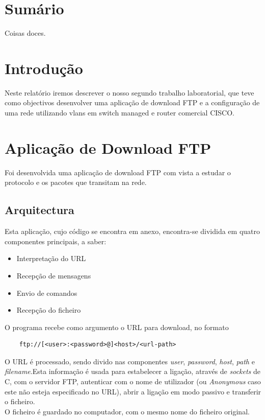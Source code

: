 \documentclass[a4paper,11pt]{article}
\begin{document}
\newpage
\section{Sumário}
Coisas doces.

\section{Introdução}
Neste relatório iremos descrever o nosso segundo trabalho laboratorial, que teve como objectivos desenvolver uma aplicação de download FTP e a configuração de uma rede utilizando vlans em switch managed e router comercial CISCO.

\section{Aplicação de Download FTP}
Foi desenvolvida uma aplicação de download FTP com vista a estudar o protocolo e os pacotes que transitam na rede.
\subsection{Arquitectura}
Esta aplicação, cujo código se encontra em anexo, encontra-se dividida em quatro componentes principais, a saber:
\begin{itemize}
\item Interpretação do URL
\item Recepção de mensagens
\item Envio de comandos
\item Recepção do ficheiro
\end{itemize}
\vspace{5pt}

O programa recebe como argumento o URL para download, no formato
\begin{lstlisting}
	ftp://[<user>:<password>@]<host>/<url-path>
\end{lstlisting}

O URL é processado, sendo divido nas componentes \textit{user}, \textit{password}, \textit{host}, \textit{path} e \textit{filename}.Esta informação é usada para estabelecer a ligação, através de \textit{sockets} de C, com o servidor FTP, autenticar com o nome de utilizador (ou \textit{Anonymous} caso este não esteja especificado no URL), abrir a ligação em modo passivo e transferir o ficheiro.\\
O ficheiro é guardado no computador, com o mesmo nome do ficheiro original.\\
\end{document}
